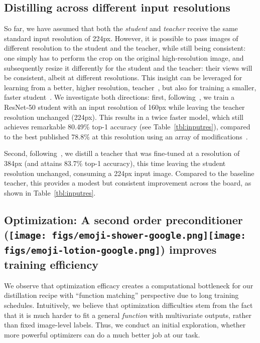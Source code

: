 \documentclass[10pt,twocolumn,letterpaper]{article}
\def \shampoo {\texttt{[image: figs/emoji-shower-google.png]}\texttt{[image: figs/emoji-lotion-google.png]}\xspace}
\begin{document}
\subsection{Distilling across different input resolutions}

So far, we have assumed that both the \emph{student} and \emph{teacher} receive the same standard input resolution of 224px.
However, it is possible to pass images of different resolution to the student and the teacher, while still being consistent: one simply has to perform the crop on the original high-resolution image, and subsequently resize it differently for the student and the teacher: their views will be consistent, albeit at different resolutions.
This insight can be leveraged for learning from a better, higher resolution, teacher~\cite{brain2020bit,touvron2019FixRes}, but also for training a smaller, faster student~\cite{bello2021revisiting}.
We investigate both directions: first, following~\cite{bello2021revisiting}, we train a ResNet-50 student with an input resolution of 160px while leaving the teacher resolution unchanged (224px). 
This results in a twice faster model, which still achieves remarkable 80.49\% top-1 accuracy (see Table~\ref{tbl:inputres}), compared to the best published  78.8\% at this resolution using an array of modifications~\cite{bello2021revisiting}.

Second, following~\cite{brain2020bit}, we distill a teacher that was fine-tuned at a resolution of 384px (and attains 83.7\% top-1 accuracy), this time leaving the student resolution unchanged, \ie consuming a 224px input image.
Compared to the baseline teacher, this provides a modest but consistent
improvement across the board, as shown in Table~\ref{tbl:inputres}.

\subsection{Optimization: A second order preconditioner (\protect\shampoo) improves training efficiency}
\label{sec:limitations1}

We observe that optimization efficacy creates a computational bottleneck for our distillation recipe with ``function matching'' perspective due to long training schedules. Intuitively, we believe that optimization difficulties stem from the fact that it is much harder to fit a general \emph{function} with multivariate outputs, rather than fixed image-level labels. Thus, we conduct an initial exploration, whether more powerful optimizers can do a much better job at our task.
\end{document}
